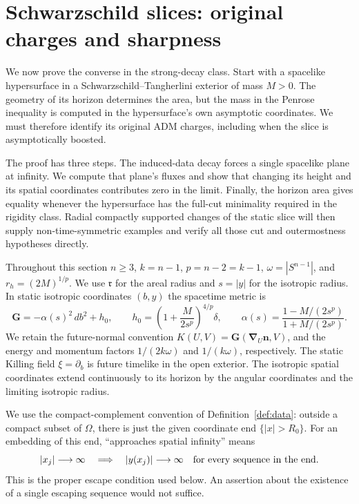 \section{Schwarzschild slices: original charges and sharpness}
\label{q:converse:sec}

We now prove the converse in the strong-decay class. Start with a spacelike
hypersurface in a Schwarzschild--Tangherlini exterior of mass $M>0$. The geometry of
its horizon determines the area, but the mass in the Penrose inequality
is computed in the hypersurface's own asymptotic coordinates.  We must
therefore identify its original ADM charges, including when the slice
is asymptotically boosted.

The proof has three steps.  The induced-data decay forces a single
spacelike plane at infinity.  We compute that plane's fluxes and show
that changing its height and its spatial coordinates contributes zero
in the limit.  Finally, the horizon area gives equality whenever the
hypersurface has the full-cut minimality required in the rigidity
class.  Radial compactly supported changes of the static slice will
then supply non-time-symmetric examples and verify all those cut and
outermostness hypotheses directly.

Throughout this section $n\ge3$, $k=n-1$, $p=n-2=k-1$,
$\omega=|S^{n-1}|$, and $r_h=(2M)^{1/p}$.
We use $\mathfrak r$ for the areal radius and $s=|y|$
for the isotropic radius.  In static isotropic coordinates $(b,y)$ the
spacetime metric is
\begin{equation}
 \mathbf G=-\alpha(s)^2\,db^2+h_0,
 \qquad
 h_0=\left(1+\frac{M}{2s^p}\right)^{4/p}\delta,
 \qquad
 \alpha(s)=\frac{1-M/(2s^p)}{1+M/(2s^p)}.
 \label{q:converse:eq:static-isotropic}
\end{equation}
We retain the future-normal convention
$K(U,V)=\mathbf G(\boldsymbol\nabla_U\mathbf n,V)$, and the energy
and momentum factors $1/(2k\omega)$ and $1/(k\omega)$, respectively.
The static Killing field $\xi=\partial_b$ is future timelike in the open
exterior.  The isotropic spatial coordinates extend continuously to its
horizon by the angular coordinates and the limiting isotropic radius.

We use the compact-complement convention of Definition~\ref{def:data}:
outside a compact subset of $\Omega$, there is just the given coordinate
end $\{|x|>R_0\}$.  For an embedding of this end, ``approaches spatial
infinity'' means
\begin{equation}
 |x_j|\longrightarrow\infty
 \quad\Longrightarrow\quad
 |y(x_j)|\longrightarrow\infty
 \quad\hbox{for every sequence in the end.}
 \label{q:converse:eq:spatial-infinity}
\end{equation}
This is the proper escape condition used below.  An assertion about the
existence of a single escaping sequence would not suffice.

